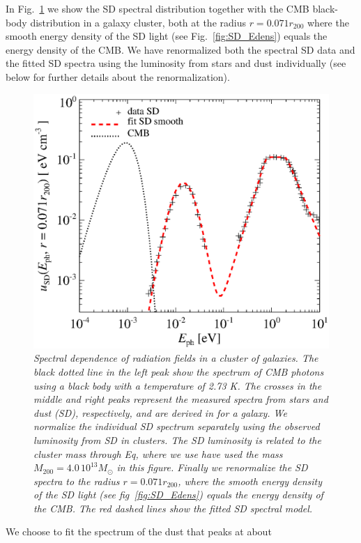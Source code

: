 \documentclass[10pt,aps,pra,reprint,amsmath,amsfonts,amssymb,showpacs]{revtex4-1}
\newcommand{\msun}{M_\odot}
\newcommand{\rvir}{r_{200}}
\newcommand{\mvir}{M_{200}}
\begin{document}
In Fig.~\ref{fig:SD_spectra} we show the SD spectral distribution
together with the CMB black-body distribution in a galaxy cluster,
both at the radius $r=0.071\rvir$ where the smooth energy density of
the SD light (see Fig.~\ref{fig:SD_Edens}) equals the energy density
of the CMB. We have renormalized both the spectral SD data and the
fitted SD spectra using the luminosity from stars and dust
individually (see below for further details about the
renormalization).
\begin{figure}%
 \includegraphics[width=0.99\columnwidth]{figures/fit.porter.v2.eps}
\caption{\it Spectral dependence of radiation fields in a cluster of
  galaxies. The black dotted line in the left peak show the spectrum
  of CMB photons using a black body with a temperature of 2.73 K. The
  crosses in the middle and right peaks represent the measured spectra
  from stars and dust (SD), respectively, and are derived in
  \cite{2006ApJ...648L..29P} for a galaxy. We normalize the individual
  SD spectrum separately using the observed luminosity from SD in
  clusters. The SD luminosity is related to the cluster mass through
  Eq, where we use have used the mass $\mvir=4.0\,10^{13}\msun$ in
  this figure. Finally we renormalize the SD spectra to the radius
  $r=0.071\rvir$, where the smooth energy density of the SD light (see
  fig~\ref{fig:SD_Edens}) equals the energy density of the CMB. The
  red dashed lines show the fitted SD spectral model.}
 \label{fig:SD_spectra}
\end{figure}
We choose to fit the spectrum of the dust that peaks at about
\end{document}
